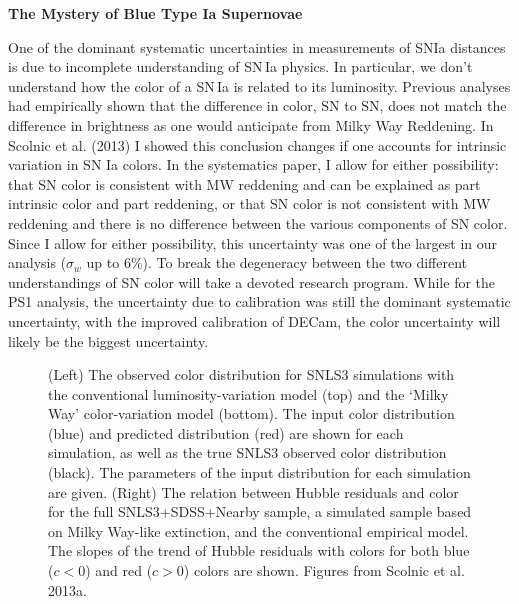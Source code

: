 \documentclass[12pt,preprint]{aastex}
\begin{document}
   

 


\textbf{The Mystery of Blue Type Ia Supernovae}

One of the dominant systematic uncertainties in measurements of SNIa distances is due to incomplete understanding of SN\,Ia physics.  In particular, we don't understand how the color of a SN\,Ia is related to its luminosity.  Previous analyses had empirically shown that the difference in color, SN to SN, does not match the difference in brightness as one would anticipate from Milky Way Reddening.  In Scolnic et al. (2013) I showed this conclusion changes if one accounts for intrinsic variation in SN Ia colors.  In the systematics paper, I allow for either possibility: that SN color is consistent with MW reddening and can be explained as part intrinsic color and part reddening, or that SN color is not consistent with MW reddening and there is no difference between the various components of SN color.  Since I allow for either possibility, this uncertainty was one of the largest in our analysis ($\sigma_w$ up to $6\%$).  To break the degeneracy between the two different understandings of SN color will take a devoted research program.  While for the PS1 analysis, the uncertainty due to calibration was still the dominant systematic uncertainty, with the improved calibration of DECam, the color uncertainty will likely be the biggest uncertainty.  


\begin{figure}[h]
\caption{(Left) The observed color distribution for SNLS3 simulations with the conventional luminosity-variation model (top) and the `Milky Way' color-variation model (bottom).  The input color distribution (blue) and predicted distribution (red) are shown for each simulation, as well as the true SNLS3 observed color distribution (black).  The parameters of the input distribution for each simulation are given. (Right) The relation between Hubble residuals and color for the full SNLS3+SDSS+Nearby sample, a simulated sample based on Milky Way-like extinction, and the conventional empirical model.  The slopes of the trend of Hubble residuals with colors for both blue ($c<0$) and red ($c>0$) colors are shown.  Figures from Scolnic et al. 2013a.   }
\end{figure}
\end{document}
